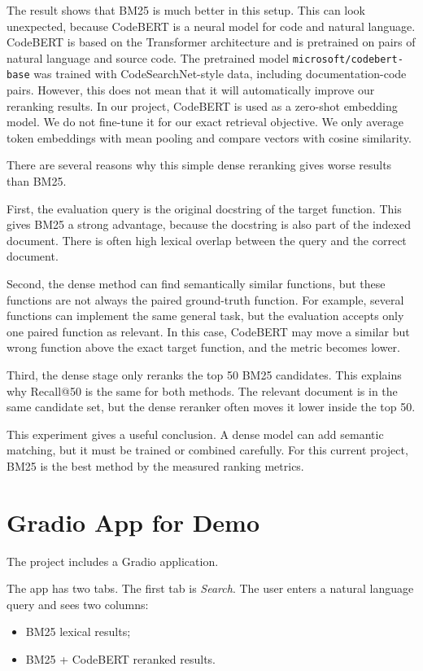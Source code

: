 \documentclass[11pt]{article}
\begin{document}
The result shows that BM25 is much better in this setup. This can look
unexpected, because CodeBERT is a neural model for code and natural language.
CodeBERT is based on the Transformer architecture and is pretrained on pairs of
natural language and source code. The pretrained model
\texttt{microsoft/codebert-base} was trained with CodeSearchNet-style data,
including documentation-code pairs. However, this does not mean that it will
automatically improve our reranking results. In our project, CodeBERT is used as
a zero-shot embedding model. We do not fine-tune it for our exact retrieval
objective. We only average token embeddings with mean pooling and compare vectors
with cosine similarity.

There are several reasons why this simple dense reranking gives worse results
than BM25.

First, the evaluation query is the original docstring of the target function.
This gives BM25 a strong advantage, because the docstring is also part of the
indexed document. There is often high lexical overlap between the query and the
correct document.

Second, the dense method can find semantically similar functions, but these
functions are not always the paired ground-truth function. For example, several
functions can implement the same general task, but the evaluation accepts only
one paired function as relevant. In this case, CodeBERT may move a similar but
wrong function above the exact target function, and the metric becomes lower.

Third, the dense stage only reranks the top 50 BM25 candidates. This explains
why Recall@50 is the same for both methods. The relevant document is in the same
candidate set, but the dense reranker often moves it lower inside the top 50.

This experiment gives a useful conclusion. A dense model can add semantic
matching, but it must be trained or combined carefully. For this current project,
BM25 is the best method by the measured ranking metrics.

\section{Gradio App for Demo}

The project includes a Gradio application.

The app has two tabs. The first tab is \textit{Search}. The user enters a
natural language query and sees two columns:
\begin{itemize}
    \item BM25 lexical results;
    \item BM25 + CodeBERT reranked results.
\end{itemize}
\end{document}
